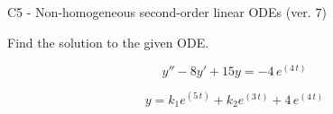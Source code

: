 \begin{exercise}
  \begin{exerciseTitle}C5 - Non-homogeneous second-order linear ODEs (ver. 7)\end{exerciseTitle}
  \begin{exerciseStatement}
    
Find the solution to the given ODE.

    
\[y''-8y'+15y = -4 \, e^{\left(4 \, t\right)}\]

  \end{exerciseStatement}
  \begin{exerciseAnswer}
    
\[y= k_{1} e^{\left(5 \, t\right)} + k_{2} e^{\left(3 \, t\right)} + 4 \, e^{\left(4 \, t\right)}\]

  \end{exerciseAnswer}
\end{exercise}